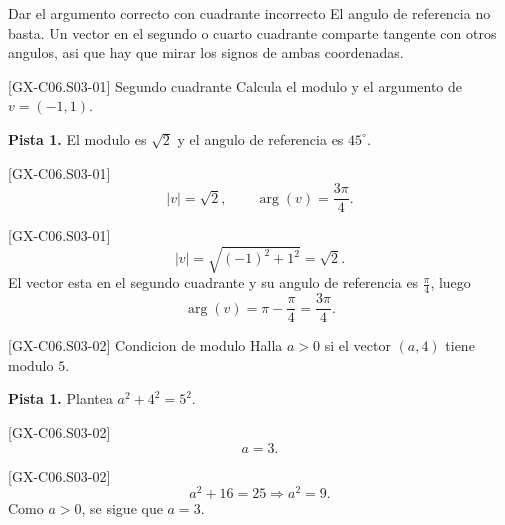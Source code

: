 \begin{commonerror}{Dar el argumento correcto con cuadrante incorrecto}
El angulo de referencia no basta. Un vector en el segundo o cuarto cuadrante comparte tangente
con otros angulos, asi que hay que mirar los signos de ambas coordenadas.
\end{commonerror}

\begin{guidedexercise}{[GX-C06.S03-01] Segundo cuadrante}
Calcula el modulo y el argumento de \(v=(-1,1)\).

\textbf{Pista 1.} El modulo es \(\sqrt{2}\) y el angulo de referencia es \(45^\circ\).
\end{guidedexercise}

\begin{shortanswer}{[GX-C06.S03-01]}
\[
|v|=\sqrt{2},
\qquad
\arg(v)=\frac{3\pi}{4}.
\]
\end{shortanswer}

\begin{fullsolution}{[GX-C06.S03-01]}
\[
|v|=\sqrt{(-1)^2+1^2}=\sqrt{2}.
\]
El vector esta en el segundo cuadrante y su angulo de referencia es \(\frac{\pi}{4}\), luego
\[
\arg(v)=\pi-\frac{\pi}{4}=\frac{3\pi}{4}.
\]
\end{fullsolution}

\begin{guidedexercise}{[GX-C06.S03-02] Condicion de modulo}
Halla \(a>0\) si el vector \((a,4)\) tiene modulo \(5\).

\textbf{Pista 1.} Plantea \(a^2+4^2=5^2\).
\end{guidedexercise}

\begin{shortanswer}{[GX-C06.S03-02]}
\[
a=3.
\]
\end{shortanswer}

\begin{fullsolution}{[GX-C06.S03-02]}
\[
a^2+16=25 \Longrightarrow a^2=9.
\]
Como \(a>0\), se sigue que \(a=3\).
\end{fullsolution}

